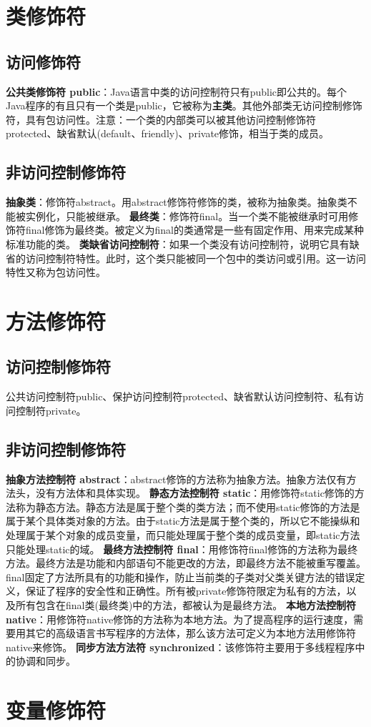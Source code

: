 \documentclass{article}
\author{浮生若梦}
\date{2025-10-21}
\begin{document}
\maketitle   \section{类修饰符}
\subsection{访问修饰符}
\textbf{公共类修饰符 public}：Java语言中类的访问控制符只有public即公共的。每个Java程序的有且只有一个类是public，它被称为\textbf{主类}。其他外部类无访问控制修饰符，具有包访问性。注意：一个类的内部类可以被其他访问控制修饰符protected、缺省默认(default、friendly)、private修饰，相当于类的成员。   \subsection{非访问控制修饰符}
\textbf{抽象类}：修饰符abstract。用abstract修饰符修饰的类，被称为抽象类。抽象类不能被实例化，只能被继承。
\textbf{最终类}：修饰符final。当一个类不能被继承时可用修饰符final修饰为最终类。被定义为final的类通常是一些有固定作用、用来完成某种标准功能的类。
\textbf{类缺省访问控制符}：如果一个类没有访问控制符，说明它具有缺省的访问控制符特性。此时，这个类只能被同一个包中的类访问或引用。这一访问特性又称为包访问性。   \section{方法修饰符}
\subsection{访问控制修饰符}
公共访问控制符public、保护访问控制符protected、缺省默认访问控制符、私有访问控制符private。   \subsection{非访问控制修饰符}
\textbf{抽象方法控制符 abstract}：abstract修饰的方法称为抽象方法。抽象方法仅有方法头，没有方法体和具体实现。
\textbf{静态方法控制符 static}：用修饰符static修饰的方法称为静态方法。静态方法是属于整个类的类方法；而不使用static修饰的方法是属于某个具体类对象的方法。由于static方法是属于整个类的，所以它不能操纵和处理属于某个对象的成员变量，而只能处理属于整个类的成员变量，即static方法只能处理static的域。
\textbf{最终方法控制符 final}：用修饰符final修饰的方法称为最终方法。最终方法是功能和内部语句不能更改的方法，即最终方法不能被重写覆盖。final固定了方法所具有的功能和操作，防止当前类的子类对父类关键方法的错误定义，保证了程序的安全性和正确性。所有被private修饰符限定为私有的方法，以及所有包含在final类(最终类)中的方法，都被认为是最终方法。
\textbf{本地方法控制符 native}：用修饰符native修饰的方法称为本地方法。为了提高程序的运行速度，需要用其它的高级语言书写程序的方法体，那么该方法可定义为本地方法用修饰符native来修饰。
\textbf{同步方法方法符 synchronized}：该修饰符主要用于多线程程序中的协调和同步。   \section{变量修饰符}
\end{document}
